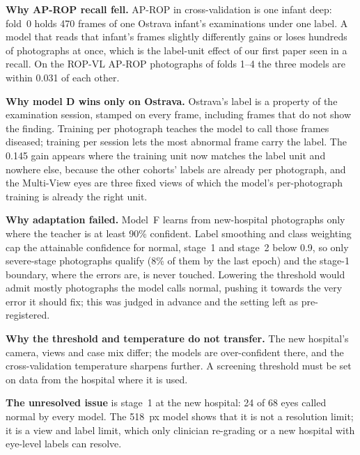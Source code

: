 \textbf{Why AP-ROP recall fell.} AP-ROP in cross-validation is one infant deep: fold~0 holds 470 frames of one Ostrava infant's examinations under one label. A model that reads that infant's frames slightly differently gains or loses hundreds of photographs at once, which is the label-unit effect of our first paper seen in a recall. On the ROP-VL AP-ROP photographs of folds 1--4 the three models are within 0.031 of each other.

\textbf{Why model D wins only on Ostrava.} Ostrava's label is a property of the examination session, stamped on every frame, including frames that do not show the finding. Training per photograph teaches the model to call those frames diseased; training per session lets the most abnormal frame carry the label. The 0.145 gain appears where the training unit now matches the label unit and nowhere else, because the other cohorts' labels are already per photograph, and the Multi-View eyes are three fixed views of which the model's per-photograph training is already the right unit.

\textbf{Why adaptation failed.} Model~F learns from new-hospital photographs only where the teacher is at least 90\% confident. Label smoothing and class weighting cap the attainable confidence for normal, stage~1 and stage~2 below 0.9, so only severe-stage photographs qualify (8\% of them by the last epoch) and the stage-1 boundary, where the errors are, is never touched. Lowering the threshold would admit mostly photographs the model calls normal, pushing it towards the very error it should fix; this was judged in advance and the setting left as pre-registered.

\textbf{Why the threshold and temperature do not transfer.} The new hospital's camera, views and case mix differ; the models are over-confident there, and the cross-validation temperature sharpens further. A screening threshold must be set on data from the hospital where it is used.

\textbf{The unresolved issue} is stage~1 at the new hospital: 24 of 68 eyes called normal by every model. The 518~px model shows that it is not a resolution limit; it is a view and label limit, which only clinician re-grading or a new hospital with eye-level labels can resolve.


